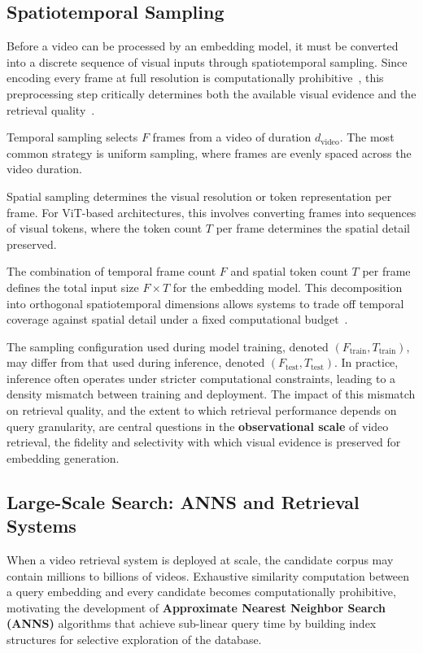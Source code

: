 \subsection{Spatiotemporal Sampling}
\label{sec:bc-spatiotemporal}

Before a video can be processed by an embedding model, it must be converted into a discrete sequence of visual inputs through spatiotemporal sampling. Since encoding every frame at full resolution is computationally prohibitive~\citep{hu2022mmsampler}, this preprocessing step critically determines both the available visual evidence and the retrieval quality~\citep{guo2025gve}.

Temporal sampling selects $F$ frames from a video of duration $d_{\mathrm{video}}$. The most common strategy is uniform sampling, where frames are evenly spaced across the video duration.

Spatial sampling determines the visual resolution or token representation per frame. For ViT-based architectures, this involves converting frames into sequences of visual tokens, where the token count $T$ per frame determines the spatial detail preserved.

The combination of temporal frame count $F$ and spatial token count $T$ per frame defines the total input size $F \times T$ for the embedding model. This decomposition into orthogonal spatiotemporal dimensions allows systems to trade off temporal coverage against spatial detail under a fixed computational budget~\citep{zhu2025dynamic}.

The sampling configuration used during model training, denoted $(F_{\text{train}}, T_{\text{train}})$, may differ from that used during inference, denoted $(F_{\text{test}}, T_{\text{test}})$. In practice, inference often operates under stricter computational constraints, leading to a density mismatch between training and deployment. The impact of this mismatch on retrieval quality, and the extent to which retrieval performance depends on query granularity, are central questions in the \textbf{observational scale} of video retrieval, the fidelity and selectivity with which visual evidence is preserved for embedding generation.

\subsection{Large-Scale Search: ANNS and Retrieval Systems}
\label{sec:bc-search}

When a video retrieval system is deployed at scale, the candidate corpus may contain millions to billions of videos. Exhaustive similarity computation between a query embedding and every candidate becomes computationally prohibitive, motivating the development of \textbf{Approximate Nearest Neighbor Search (ANNS)} algorithms that achieve sub-linear query time by building index structures for selective exploration of the database.

